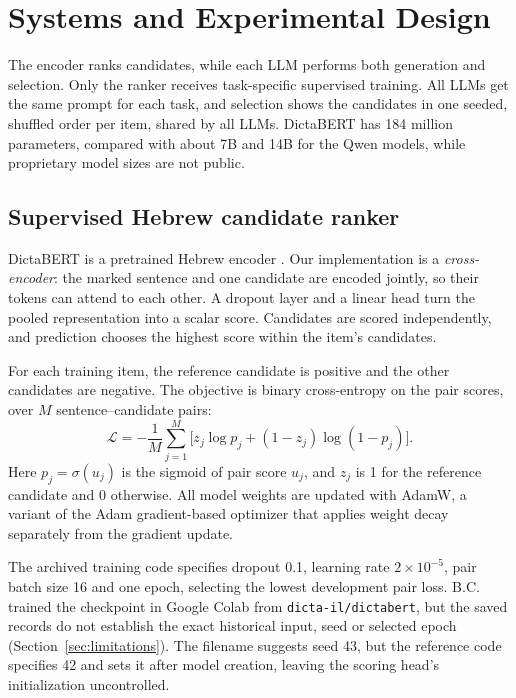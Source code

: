 \section{Systems and Experimental Design}
\label{sec:systems}
The encoder ranks candidates, while each LLM performs both generation and selection. Only the ranker receives task-specific supervised training. All LLMs get the same prompt for each task, and selection shows the candidates in one seeded, shuffled order per item, shared by all LLMs. DictaBERT has 184 million parameters, compared with about 7B and 14B for the Qwen models, while proprietary model sizes are not public.

\subsection{Supervised Hebrew candidate ranker}
DictaBERT is a pretrained Hebrew encoder \citep{shmidman2023dictabert}. Our implementation is a \emph{cross-encoder}: the marked sentence and one candidate are encoded jointly, so their tokens can attend to each other. A dropout layer and a linear head turn the pooled representation into a scalar score. Candidates are scored independently, and prediction chooses the highest score within the item's candidates.

For each training item, the reference candidate is positive and the other candidates are negative. The objective is binary cross-entropy on the pair scores, over $M$ sentence--candidate pairs:
\begin{equation}
\mathcal{L}=-\frac{1}{M}\sum_{j=1}^{M}\big[z_j\log p_j+(1-z_j)\log(1-p_j)\big].
\end{equation}
Here $p_j=\sigma(u_j)$ is the sigmoid of pair score $u_j$, and $z_j$ is 1 for the reference candidate and 0 otherwise. All model weights are updated with AdamW, a variant of the Adam gradient-based optimizer that applies weight decay separately from the gradient update.

The archived training code specifies dropout 0.1, learning rate $2\times10^{-5}$, pair batch size 16 and one epoch, selecting the lowest development pair loss. B.C. trained the checkpoint in Google Colab from \texttt{dicta-il/dictabert}, but the saved records do not establish the exact historical input, seed or selected epoch (Section~\ref{sec:limitations}). The filename suggests seed 43, but the reference code specifies 42 and sets it after model creation, leaving the scoring head's initialization uncontrolled.

